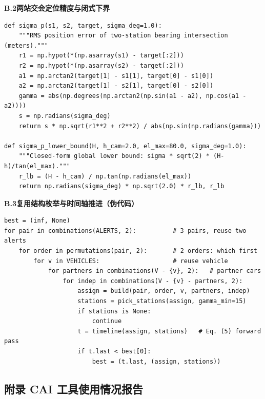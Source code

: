 \documentclass[UTF8,a4paper,zihao=-4,oneside]{ctexart}
\begin{document}
\noindent\textbf{B.2\quad 两站交会定位精度与闭式下界}
\begin{lstlisting}
def sigma_p(s1, s2, target, sigma_deg=1.0):
    """RMS position error of two-station bearing intersection (meters)."""
    r1 = np.hypot(*(np.asarray(s1) - target[:2]))
    r2 = np.hypot(*(np.asarray(s2) - target[:2]))
    a1 = np.arctan2(target[1] - s1[1], target[0] - s1[0])
    a2 = np.arctan2(target[1] - s2[1], target[0] - s2[0])
    gamma = abs(np.degrees(np.arctan2(np.sin(a1 - a2), np.cos(a1 - a2))))
    s = np.radians(sigma_deg)
    return s * np.sqrt(r1**2 + r2**2) / abs(np.sin(np.radians(gamma)))

def sigma_p_lower_bound(H, h_cam=2.0, el_max=80.0, sigma_deg=1.0):
    """Closed-form global lower bound: sigma * sqrt(2) * (H-h)/tan(el_max)."""
    r_lb = (H - h_cam) / np.tan(np.radians(el_max))
    return np.radians(sigma_deg) * np.sqrt(2.0) * r_lb, r_lb
\end{lstlisting}

\noindent\textbf{B.3\quad 复用结构枚举与时间轴推进（伪代码）}
\begin{lstlisting}
best = (inf, None)
for pair in combinations(ALERTS, 2):          # 3 pairs, reuse two alerts
    for order in permutations(pair, 2):       # 2 orders: which first
        for v in VEHICLES:                    # reuse vehicle
            for partners in combinations(V - {v}, 2):   # partner cars
                for indep in combinations(V - {v} - partners, 2):
                    assign = build(pair, order, v, partners, indep)
                    stations = pick_stations(assign, gamma_min=15)
                    if stations is None:
                        continue
                    t = timeline(assign, stations)   # Eq. (5) forward pass
                    if t.last < best[0]:
                        best = (t.last, (assign, stations))
\end{lstlisting}

\subsection*{附录 C\quad AI 工具使用情况报告}
\end{document}
